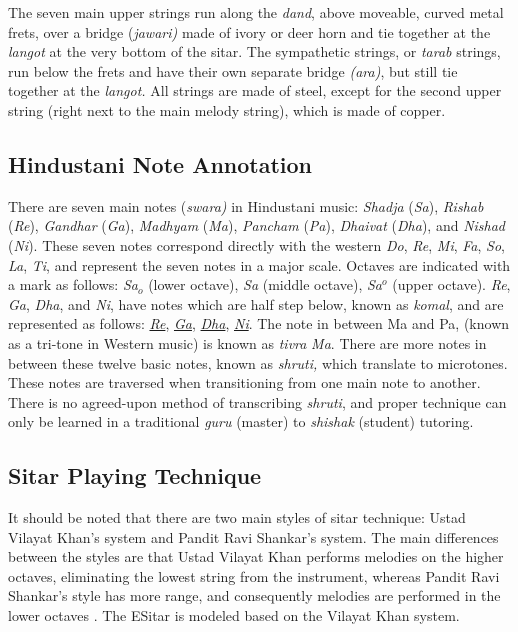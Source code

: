 The seven main upper strings run along the \textit{dand}, above moveable, curved metal frets, over a bridge (\textit{jawari)} made of ivory or deer horn and tie together at the \textit{langot }at the very bottom of the sitar. The sympathetic strings, or \textit{tarab} strings, run below the frets and have their own separate bridge \textit{(ara)}, but still tie together at the \textit{langot.} All strings are made of steel, except for the second upper string (right next to the main melody string), which is made of copper.

\subsection{Hindustani Note Annotation}

There are seven main notes (\textit{swara)} in Hindustani music: \textit{Shadja}
(\textit{Sa}), \textit{Rishab} (\textit{Re}), \textit{Gandhar} (\textit{Ga}),
\textit{Madhyam} (\textit{Ma}), \textit{Pancham} (\textit{Pa}), \textit{Dhaivat}
(\textit{Dha}), and \textit{Nishad} (\textit{Ni}). These seven notes correspond
directly with the western \textit{Do}, \textit{Re}, \textit{Mi}, \textit{Fa},
\textit{So}, \textit{La}, \textit{Ti}, and represent the seven notes in a major
scale. Octaves are indicated with a mark as follows: \textit{Sa$_{o}$} (lower
octave), \textit{Sa} (middle octave), \textit{Sa$^{o}$} (upper octave).
\textit{Re}, \textit{Ga}, \textit{Dha}, and \textit{Ni}, have notes which are
half step below, known as \textit{komal}, and are represented as follows:
\textit{\underline{Re}}, \textit{\underline{Ga}}, \textit{\underline{Dha}},
\textit{\underline{Ni}}. The note in between Ma and Pa, (known as a tri-tone in 
Western music) is known as \textit{tivra} \textit{Ma}. There are more notes in
between these twelve basic notes, known as \textit{shruti,} which translate to
microtones. These notes are traversed when transitioning from one main note to
another. There is no agreed-upon method of transcribing \textit{shruti}, and
proper technique can only be learned in a traditional \textit{guru} (master) to
\textit{shishak}  (student) tutoring. \cite{Bagchee:1998,Sharma:1997,Vir:1998}

\subsection{Sitar Playing Technique}

It should be noted that there are two main styles of sitar technique: Ustad
Vilayat Khan's system and Pandit Ravi Shankar's system. The main differences
between the styles are that Ustad Vilayat Khan performs melodies on the higher
octaves, eliminating the lowest string from the instrument, whereas Pandit Ravi
Shankar's style has more range, and consequently melodies are performed in the
lower octaves \cite{Bagchee:1998}. The ESitar is modeled based on the Vilayat Khan
system.

